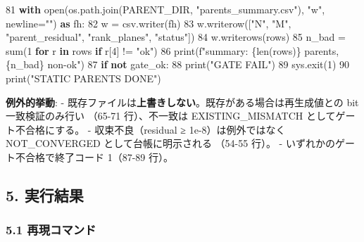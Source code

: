 \documentclass[
  a4paper,
]{ltjsarticle}
\newenvironment{Shaded}{}{}
\newcommand{\BuiltInTok}[1]{\textcolor[rgb]{0.00,0.50,0.00}{#1}}
\newcommand{\ControlFlowTok}[1]{\textcolor[rgb]{0.00,0.44,0.13}{\textbf{#1}}}
\newcommand{\DecValTok}[1]{\textcolor[rgb]{0.25,0.63,0.44}{#1}}
\newcommand{\ImportTok}[1]{\textcolor[rgb]{0.00,0.50,0.00}{\textbf{#1}}}
\newcommand{\KeywordTok}[1]{\textcolor[rgb]{0.00,0.44,0.13}{\textbf{#1}}}
\newcommand{\NormalTok}[1]{#1}
\newcommand{\OperatorTok}[1]{\textcolor[rgb]{0.40,0.40,0.40}{#1}}
\newcommand{\SpecialCharTok}[1]{\textcolor[rgb]{0.25,0.44,0.63}{#1}}
\newcommand{\SpecialStringTok}[1]{\textcolor[rgb]{0.73,0.40,0.53}{#1}}
\newcommand{\StringTok}[1]{\textcolor[rgb]{0.25,0.44,0.63}{#1}}
\begin{document}
\begin{Shaded}
\begin{Highlighting}[]
    \DecValTok{81}      \ControlFlowTok{with} \BuiltInTok{open}\NormalTok{(os.path.join(PARENT\_DIR, }\StringTok{"parents\_summary.csv"}\NormalTok{), }\StringTok{"w"}\NormalTok{, newline}\OperatorTok{=}\StringTok{""}\NormalTok{) }\ImportTok{as}\NormalTok{ fh:}
    \DecValTok{82}\NormalTok{          w }\OperatorTok{=}\NormalTok{ csv.writer(fh)}
    \DecValTok{83}\NormalTok{          w.writerow([}\StringTok{"N"}\NormalTok{, }\StringTok{"M"}\NormalTok{, }\StringTok{"parent\_residual"}\NormalTok{, }\StringTok{"rank\_planes"}\NormalTok{, }\StringTok{"status"}\NormalTok{])}
    \DecValTok{84}\NormalTok{          w.writerows(rows)}
    \DecValTok{85}\NormalTok{      n\_bad }\OperatorTok{=} \BuiltInTok{sum}\NormalTok{(}\DecValTok{1} \ControlFlowTok{for}\NormalTok{ r }\KeywordTok{in}\NormalTok{ rows }\ControlFlowTok{if}\NormalTok{ r[}\DecValTok{4}\NormalTok{] }\OperatorTok{!=} \StringTok{"ok"}\NormalTok{)}
    \DecValTok{86}      \BuiltInTok{print}\NormalTok{(}\SpecialStringTok{f"summary: }\SpecialCharTok{\{}\BuiltInTok{len}\NormalTok{(rows)}\SpecialCharTok{\}}\SpecialStringTok{ parents, }\SpecialCharTok{\{}\NormalTok{n\_bad}\SpecialCharTok{\}}\SpecialStringTok{ non{-}ok"}\NormalTok{)}
    \DecValTok{87}      \ControlFlowTok{if} \KeywordTok{not}\NormalTok{ gate\_ok:}
    \DecValTok{88}          \BuiltInTok{print}\NormalTok{(}\StringTok{"GATE FAIL"}\NormalTok{)}
    \DecValTok{89}\NormalTok{          sys.exit(}\DecValTok{1}\NormalTok{)}
    \DecValTok{90}      \BuiltInTok{print}\NormalTok{(}\StringTok{"STATIC PARENTS DONE"}\NormalTok{)}
\end{Highlighting}
\end{Shaded}

\textbf{例外的挙動}: -
既存ファイルは\textbf{上書きしない}。既存がある場合は再生成値との bit
一致検証のみ行い （65-71 行）、不一致は EXISTING\_MISMATCH
としてゲート不合格にする。 - 収束不良（residual ≥ 1e-8）は例外ではなく
NOT\_CONVERGED として台帳に明示される （54-55 行）。 -
いずれかのゲート不合格で終了コード 1（87-89 行）。

\subsection{5. 実行結果}\label{ux5b9fux884cux7d50ux679c}

\subsubsection{5.1
再現コマンド}\label{ux518dux73feux30b3ux30deux30f3ux30c9}
\end{document}
